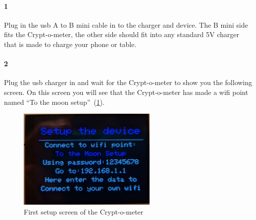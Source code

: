 \documentclass[11pt]{article}
\begin{document}
    \paragraph{1} Plug in the usb A to B mini cable in to the charger and device.
    The B mini side fits the Crypt-o-meter, the other side should fit into any standard 5V charger that is made to charge your phone or table.
    \paragraph{2} Plug the usb charger in and wait for the Crypt-o-meter to show you the following screen.
    On this screen you will see that the Crypt-o-meter has made a wifi point named ``To the moon setup''~(\textcolor{blue}{\cref{fig:firt_setup}}).

    \begin{figure}[H]
        \centering
        \includegraphics[width= 0.6\textwidth]{step_1}
        \caption{First setup screen of the Crypt-o-meter}
        \label{fig:firt_setup}
    \end{figure}
    
    \newpage
\end{document}
